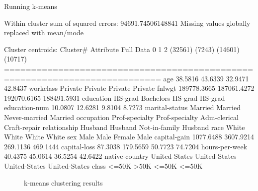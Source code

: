 \documentclass{sig-alternate}
\begin{document}
\tiny
\begin{verbbox}
Running k-means

Within cluster sum of squared errors: 94691.74506148841
Missing values globally replaced with mean/mode

Cluster centroids:
                                     Cluster#
Attribute           Full Data               0              1              2
                      (32561)          (7243)        (14601)        (10717)
===========================================================================
age                   38.5816         43.6339        32.9471        42.8437
workclass             Private         Private        Private        Private
fnlwgt            189778.3665     187061.4272    192070.6165    188491.5931
education             HS-grad       Bachelors        HS-grad        HS-grad
education-num         10.0807         12.6281         9.8104         8.7273
marital-status        Married         Married  Never-married        Married
occupation     Prof-specialty  Prof-specialty   Adm-clerical   Craft-repair
relationship          Husband         Husband  Not-in-family        Husband
race                    White           White          White          White
sex                      Male            Male         Female           Male
capital-gain        1077.6488       3607.9214       269.1136       469.1444
capital-loss          87.3038        179.5659        50.7723        74.7204
hours-per-week        40.4375         45.0614        36.5254        42.6422
native-country  United-States   United-States  United-States  United-States
class                   <=50K            >50K          <=50K          <=50K
\end{verbbox}
\normalsize

\begin{figure}[!htbp]
    \centering
    \theverbbox
    \caption{k-means clustering results\label{kmeans-summary}}
\end{figure}
\end{document}
